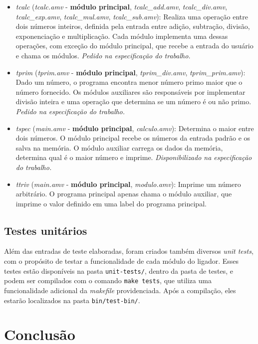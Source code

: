\documentclass[12pt,a4paper]{article}
\numberwithin{equation}{section}
\begin{document}
\begin{itemize}
    \item \emph{tcalc} (\emph{tcalc.amv} - \textbf{módulo principal}, \emph{tcalc\_add.amv}, \emph{tcalc\_div.amv}, \emph{tcalc\_exp.amv}, \emph{tcalc\_mul.amv}, \emph{tcalc\_sub.amv}): Realiza uma operação entre dois números inteiros, definida pela entrada entre adição, subtração, divisão, exponenciação e multiplicação. Cada módulo implementa uma dessas operações, com exceção do módulo principal, que recebe a entrada do usuário e chama os módulos. \emph{Pedido na especificação do trabalho.}
    \item \emph{tprim} (\emph{tprim.amv} - \textbf{módulo principal}, \emph{tprim\_div.amv}, \emph{tprim\_prim.amv}): Dado um número, o programa encontra menor número primo maior que o número fornecido. Os módulos auxiliares são responsáveis por implementar divisão inteira e uma operação que determina se um número é ou não primo. \emph{Pedido na especificação do trabalho.}
    \item \emph{tspec} (\emph{main.amv} - \textbf{módulo principal}, \emph{calculo.amv}): Determina o maior entre dois números. O módulo principal recebe os números da entrada padrão e os salva na memória. O módulo auxiliar carrega os dados da memória, determina qual é o maior número e imprime. \emph{Disponibilizado na especificação do trabalho.}
    \item \emph{ttriv} (\emph{main.amv} - \textbf{módulo principal}, \emph{modulo.amv}): Imprime um número arbitrário. O programa principal apenas chama o módulo auxiliar, que imprime o valor definido em uma label do programa principal.
\end{itemize}

\subsection{Testes unitários}

Além das entradas de teste elaboradas, foram criados também diversos \emph{unit tests}, com o propósito de testar a funcionalidade de cada módulo do ligador. Esses testes estão disponíveis na pasta \verb|unit-tests/|, dentro da pasta de testes, e podem ser compilados com o comando \verb|make tests|, que utiliza uma funcionalidade adicional da \emph{makefile} providenciada. Após a compilação, eles estarão localizados na pasta \verb|bin/test-bin/|.

\section{Conclusão}
\end{document}
